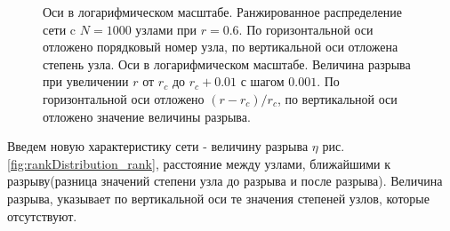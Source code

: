 \documentclass[10pt,aps,pra]{revtex4-1}
\begin{document}
            \begin{figure}[H]  
                \centering

                \caption{
                    \label{fig:rankDistribution}
                     Оси в логарифмическом масштабе. Ранжированное распределение сети c $N=1000$ узлами при $r=0.6$. По горизонтальной оси отложено порядковый номер узла, по вертикальной оси отложена степень узла.
                     Оси в логарифмическом масштабе. Величина разрыва при увеличении $r$ от $r_c$ до $r_c + 0.01$ с шагом $0.001$. По горизонтальной оси отложено $(r-r_c)/r_c$, по вертикальной оси отложено значение величины разрыва.
                }
            \end{figure}

        Введем новую характеристику сети - величину разрыва $\eta$ рис. \ref{fig:rankDistribution_rank}, расстояние между узлами, ближайшими к разрыву(разница значений степени узла до разрыва и после разрыва). Величина разрыва, указывает по вертикальной оси те значения степеней узлов, которые отсутствуют. 
\end{document}
